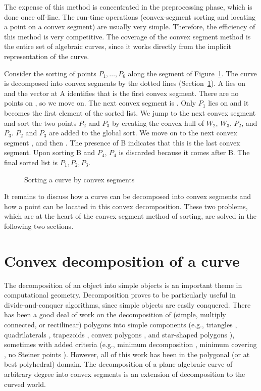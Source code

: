 The expense of this method is concentrated in the preprocessing phase, which
is done once off-line. 
The run-time operations (convex-segment sorting and
locating a point on a convex segment) are usually very simple.
Therefore, the efficiency of this method is very competitive.
The coverage of the convex segment method is the entire set of algebraic curves,
since it works directly from the implicit representation of the curve.

\begin{example}
Consider the sorting of points $P_{1}, \ldots, P_{6}$ 
along the segment  of Figure~\ref{2.12a}.
The curve is decomposed into convex segments by the dotted lines 
(Section~\ref{s-dec}).
A lies on  and
the vector at A identifies that  is the first convex segment.
There are no points on , so we move on.
The next convex segment is \arc{\wo\wt}.
Only $P_{1}$ lies on \arc{\wo\wt} and it becomes the first element of the 
sorted list.
We jump to the next convex segment  and
sort the two points $P_{2}$ and $P_{3}$ 
by creating the convex hull of $W_{2}$, $W_{3}$, $P_{2}$, and $P_{3}$.
$P_{2}$ and $P_{3}$ are added to the global sort.
We move on to the next convex segment , and then .
The presence of B indicates that this is the last convex segment.
Upon sorting B and $P_{4}$, $P_{4}$ is discarded because it comes after B.
The final sorted list is $P_{1},P_{2},P_{3}$.
\end{example}

\begin{figure}[htbp]\vspace{2.75in}\caption{Sorting a curve by convex segments}\label{2.12a}\end{figure}

It remains to discuss how a curve can be decomposed into convex segments and
how a point can be located in this convex decomposition.
These two problems, which are at the heart of the convex segment method 
of sorting, are solved in the following two sections.

\section{Convex decomposition of a curve}
\label{s-dec}
%
The decomposition of an object into simple objects is an important theme
in computational geometry.
Decomposition proves to be particularly useful in divide-and-conquer algorithms, 
since simple objects are easily conquered.
There has been a good deal of work on the decomposition of 
(simple, multiply connected, or rectilinear) polygons into simple components
(e.g., triangles \cite{CI,G,H,T}, quadrilaterals \cite{S}, 
trapezoids \cite{As}, convex polygons  \cite{cd,tm}, and star-shaped 
polygons \cite{Av}), sometimes with added criteria (e.g., minimum decomposition 
\cite{cd,keil}, minimum covering \cite{O}, no Steiner points \cite{keil}).
However, all of this work has been in the polygonal (or at best polyhedral) 
domain.
The decomposition of a plane algebraic curve of arbitrary degree into convex 
segments is an extension of decomposition to the curved world.

